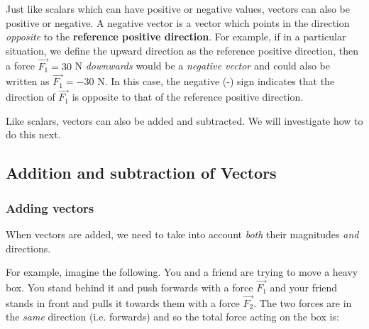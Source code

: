 

Just like scalars which can have positive or negative values, vectors can also be positive or negative. 
A negative vector is a vector which points in the direction \textit{opposite} to the \textbf{reference positive direction}. 
For example, if in a particular situation, we define the upward direction as the reference positive direction, then a force $\stackrel{\to }{F_{1}} = 30$ N \textit{downwards} would be a \textit{negative vector} and could also be written as $\stackrel{\to }{F_{1}} = -30$ N. In this case, the negative (-) sign indicates that the direction of $\stackrel{\to }{F_{1}}$ is opposite to that of the reference positive direction.


Like scalars, vectors can also be added and subtracted. We will investigate how to do this next.

\label{m38813*uid35}
\subsection*{Addition and subtraction of Vectors}
            \nopagebreak
        \label{m38813*id188304}

\subsubsection{Adding vectors}
When vectors are added, we need to take into account \textit{both} their magnitudes \textit{and} directions. 

For example, imagine the following. You and a friend are trying to move a heavy box. You stand behind it and push forwards with a force $\stackrel{\to }{F_{1}}$ and your friend stands in front and pulls it towards them with a force $\stackrel{\to }{F_{2}}$. The two forces are in the \textit{same} direction (i.e. forwards) and so the total force acting on the box is:

